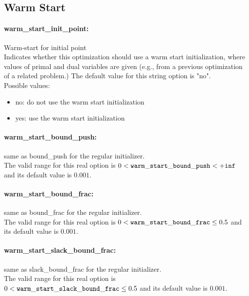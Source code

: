\subsection{Warm Start}

\paragraph{warm\_start\_init\_point:}\label{opt:warm_start_init_point} Warm-start for initial point \\
 Indicates whether this optimization should use a warm start initialization, where values of primal and dual variables are given (e.g., from a previous optimization of a related problem.) The default value for this string option is "no".
\\ 
Possible values:
\begin{itemize}
   \item no: do not use the warm start initialization
   \item yes: use the warm start initialization
\end{itemize}

\paragraph{warm\_start\_bound\_push:}\label{opt:warm_start_bound_push} same as bound\_push for the regular initializer. \\
 The valid range for this real option is 
$0 <  {\tt warm\_start\_bound\_push } <  {\tt +inf}$
and its default value is $0.001$.


\paragraph{warm\_start\_bound\_frac:}\label{opt:warm_start_bound_frac} same as bound\_frac for the regular initializer. \\
 The valid range for this real option is 
$0 <  {\tt warm\_start\_bound\_frac } \le 0.5$
and its default value is $0.001$.


\paragraph{warm\_start\_slack\_bound\_frac:}\label{opt:warm_start_slack_bound_frac} same as slack\_bound\_frac for the regular initializer. \\
 The valid range for this real option is 
$0 <  {\tt warm\_start\_slack\_bound\_frac } \le 0.5$
and its default value is $0.001$.


